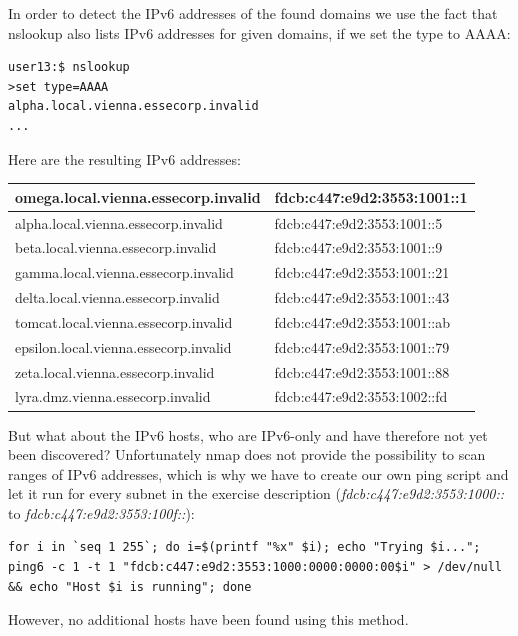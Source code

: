 \documentclass[12pt,a4paper,titlepage,oneside]{scrartcl}
\begin{document}
In order to detect the IPv6 addresses of the found domains we use the fact that nslookup also lists IPv6 addresses for given domains, if we set the type to AAAA:

\begin{lstlisting}[style=simple]
user13:$ nslookup 
>set type=AAAA
alpha.local.vienna.essecorp.invalid
...
\end{lstlisting}

Here are the resulting IPv6 addresses:

\begin{tabular}{l | l}
\hline
omega.local.vienna.essecorp.invalid & fdcb:c447:e9d2:3553:1001::1 \bigstrut \\ \hline
alpha.local.vienna.essecorp.invalid & fdcb:c447:e9d2:3553:1001::5 \bigstrut \\ \hline
beta.local.vienna.essecorp.invalid & fdcb:c447:e9d2:3553:1001::9 \bigstrut \\ \hline
gamma.local.vienna.essecorp.invalid & fdcb:c447:e9d2:3553:1001::21 \bigstrut \\ \hline
delta.local.vienna.essecorp.invalid & fdcb:c447:e9d2:3553:1001::43 \bigstrut \\ \hline
tomcat.local.vienna.essecorp.invalid & fdcb:c447:e9d2:3553:1001::ab \bigstrut \\ \hline
epsilon.local.vienna.essecorp.invalid & fdcb:c447:e9d2:3553:1001::79 \bigstrut \\ \hline
zeta.local.vienna.essecorp.invalid & fdcb:c447:e9d2:3553:1001::88 \bigstrut \\ \hline
lyra.dmz.vienna.essecorp.invalid & fdcb:c447:e9d2:3553:1002::fd \bigstrut \\ \hline
\end{tabular}

But what about the IPv6 hosts, who are IPv6-only and have therefore not yet been discovered? Unfortunately nmap does not provide the possibility to scan ranges of IPv6 addresses, which is why we have to create our own ping script and let it run for every subnet in the exercise description (\emph{fdcb:c447:e9d2:3553:1000::} to \emph{fdcb:c447:e9d2:3553:100f::}):

\begin{lstlisting}[style=simple]
for i in `seq 1 255`; do i=$(printf "%x" $i); echo "Trying $i..."; ping6 -c 1 -t 1 "fdcb:c447:e9d2:3553:1000:0000:0000:00$i" > /dev/null && echo "Host $i is running"; done
\end{lstlisting}

However, no additional hosts have been found using this method.
\end{document}
